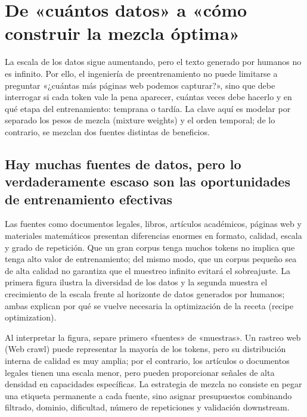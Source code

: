 \section{De «cuántos datos» a «cómo construir la mezcla óptima»}

La escala de los datos sigue aumentando, pero el texto generado por humanos no es infinito. Por ello, el ingeniería de preentrenamiento no puede limitarse a preguntar «¿cuántas más páginas web podemos capturar?», sino que debe interrogar si cada token vale la pena aparecer, cuántas veces debe hacerlo y en qué etapa del entrenamiento: temprana o tardía. La clave aquí es modelar por separado los pesos de mezcla (mixture weights) y el orden temporal; de lo contrario, se mezclan dos fuentes distintas de beneficios.

\subsection{Hay muchas fuentes de datos, pero lo verdaderamente escaso son las oportunidades de entrenamiento efectivas}

Las fuentes como documentos legales, libros, artículos académicos, páginas web y materiales matemáticos presentan diferencias enormes en formato, calidad, escala y grado de repetición. Que un gran corpus tenga muchos tokens no implica que tenga alto valor de entrenamiento; del mismo modo, que un corpus pequeño sea de alta calidad no garantiza que el muestreo infinito evitará el sobreajuste. La primera figura ilustra la diversidad de los datos y la segunda muestra el crecimiento de la escala frente al horizonte de datos generados por humanos; ambas explican por qué se vuelve necesaria la optimización de la receta (recipe optimization).


Al interpretar la figura, separe primero «fuentes» de «muestras». Un rastreo web (Web crawl) puede representar la mayoría de los tokens, pero su distribución interna de calidad es muy amplia; por el contrario, los artículos o documentos legales tienen una escala menor, pero pueden proporcionar señales de alta densidad en capacidades específicas. La estrategia de mezcla no consiste en pegar una etiqueta permanente a cada fuente, sino asignar presupuestos combinando filtrado, dominio, dificultad, número de repeticiones y validación downstream.

